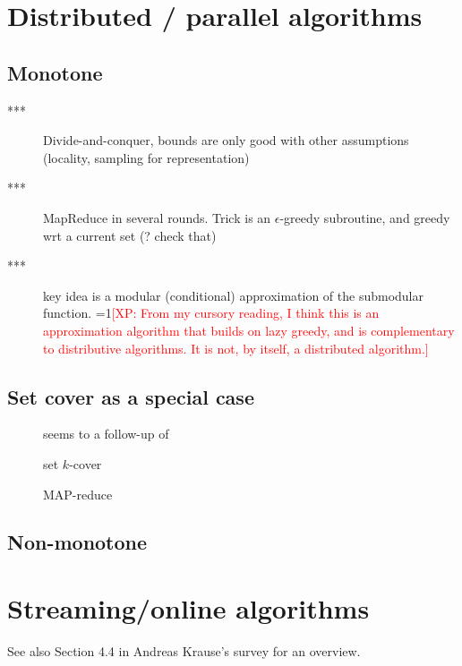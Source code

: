\documentclass{article}
\newcommand{\Comments}{1}
\newcommand{\note}[2]{\ifnum\Comments=1\textcolor{#1}{#2}\fi}
\newcommand{\xinghao}[1]{\note{red}{[XP: #1]}}
\begin{document}
\section{Distributed / parallel algorithms}

\subsection{Monotone}

\begin{description}
\item[\citet{Mirzasoleiman2013}***] Divide-and-conquer, bounds are only good with other assumptions (locality, sampling for representation)
\item[\citet{kumar13}***] MapReduce in several rounds. Trick is an $\epsilon$-greedy subroutine, and greedy wrt a current set (? check that)
\item[\citet{wei14}***] key idea is a modular (conditional) approximation of the submodular function. \xinghao{From my cursory reading, I think this is an approximation algorithm that builds on lazy greedy, and is complementary to distributive algorithms. It is not, by itself, a distributed algorithm.}
\end{description}

\subsection{Set cover as a special case}

\begin{description}
\item[\citet{blelloch12}] seems to a follow-up of \citep{blelloch11}
\item[\citet{abrams04}] set $k$-cover
\item[\citet{koufog}]
\item[\citet{chierichetti10}] MAP-reduce
\end{description}

\subsection{Non-monotone}



\section{Streaming/online algorithms}

See also Section 4.4 in Andreas Krause's survey for an overview.
\end{document}
